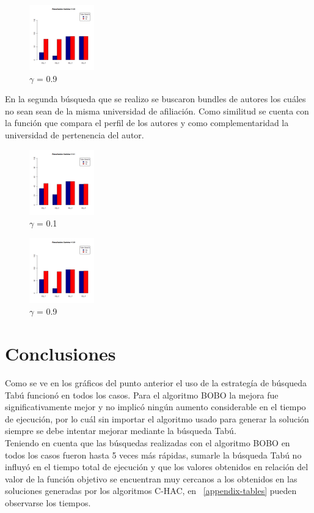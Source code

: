 \begin{figure}[H]
	\centering
	\includegraphics[width=0.25\textwidth]{img/gamma09.png}
	\caption{$\gamma$ = 0.9}
	\label{res:img-gamma09-papers}
\end{figure}
En la segunda búsqueda que se realizo se buscaron bundles de autores los cuáles no sean sean de la misma universidad de afiliación. Como similitud se cuenta con la función que compara el perfil de los autores y como complementaridad la universidad de pertenencia del autor.
\begin{figure}[H]
	\centering
	\includegraphics[width=0.25\textwidth]{img/gamma01-autores.png}
	\caption{$\gamma$ = 0.1}
	\label{res:img-gamma01-authors}
\end{figure}

\begin{figure}[H]
	\centering
	\includegraphics[width=0.25\textwidth]{img/gamma09-autores.png}
	\caption{$\gamma$ = 0.9}
	\label{res:img-gamma09-authors}
\end{figure}
\section{Conclusiones}
Como se ve en los gráficos del punto anterior el uso de la estrategía de búsqueda Tabú funcionó en todos los casos. Para el algoritmo BOBO la mejora fue significativamente mejor y no implicó ningún aumento considerable en el tiempo de ejecución, por lo cuál sin importar el algoritmo usado para generar la solución siempre se debe intentar mejorar mediante la búsqueda Tabú.\\
Teniendo en cuenta que las búsquedas realizadas con el algoritmo BOBO en todos los casos fueron hasta 5 veces más rápidas, sumarle la búsqueda Tabú no influyó en el tiempo total de ejecución y que los valores obtenidos en relación del valor de la función objetivo se encuentran muy cercanos a los obtenidos en las soluciones generadas por los algoritmos C-HAC, en ~\ref{appendix-tables} pueden observarse los tiempos.
